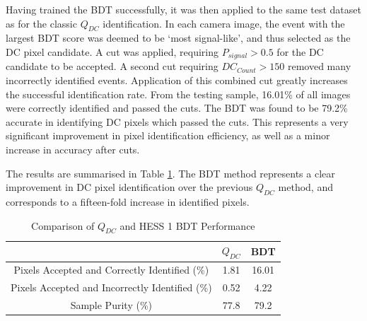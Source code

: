 \documentclass[11pt]{article}
\begin{document}
Having trained the BDT successfully, it was then applied to the same test dataset as for the classic $Q_{DC}$ identification. In each camera image, the event with the largest BDT score was deemed to be \textquoteleft most signal-like', and thus selected as the DC pixel candidate. A cut was applied, requiring $P_{signal} > 0.5$ for the DC candidate to be accepted. A second cut requiring $DC_{Count} > 150$ removed many incorrectly identified events. Application of this combined cut greatly increases the successful identification rate. From the testing sample, 16.01\% of all images were correctly identified and passed the cuts. The BDT was found to be 79.2\% accurate in identifying DC pixels which passed the cuts. This represents a very significant improvement in pixel identification efficiency, as well as a minor increase in accuracy after cuts. 

The results are summarised in Table \ref{tab:qdcbdtcomparison1}. The BDT method represents a clear improvement in DC pixel identification over the previous $Q_{DC}$ method, and corresponds to a fifteen-fold increase in identified pixels. 

\begin{table}[h!]
  \centering
  \caption{Comparison of $Q_{DC}$ and HESS 1 BDT Performance}
  \label{tab:qdcbdtcomparison1}
  \begin{tabular}{ccc}
    \toprule
    & $Q_{DC}$ & BDT\\
    \midrule
    Pixels Accepted and Correctly Identified (\%)  & 1.81 & 16.01\\
   Pixels Accepted and Incorrectly Identified (\%)  & 0.52& 4.22\\
    Sample Purity (\%)  & 77.8 & 79.2 \\
    \bottomrule
  \end{tabular}
\end{table}
\end{document}
